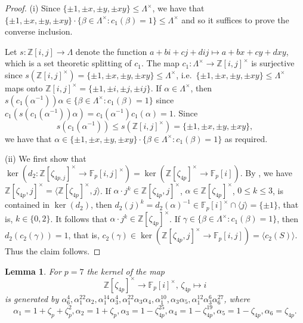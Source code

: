 \documentclass[11pt,leqno,a4paper]{amsart}
\newcommand{\Z}{\mathbb{Z}}
\newcommand{\F}{\mathbb{F}}
\newtheorem{lemma}[thm]{Lemma}
\theoremstyle{definition}
\theoremstyle{remark}
\theoremstyle{custom}
\renewcommand{\l}{\Lambda}
\begin{document}
\begin{proof}
(i) Since $\{\pm 1, \pm x, \pm y, \pm xy\} \le \l^\times$, we have that $\{\pm 1, \pm x, \pm y, \pm xy\} \cdot \{ \beta \in \l^\times : c_1(\beta)=1\} \le \l^\times$ and so it suffices to prove the converse inclusion.

Let $s : \Z[i,j] \to \l$ denote the function $a +bi +cj +dij \mapsto a+bx+cy+dxy$, which is a set theoretic splitting of $c_1$.
The map $c_1 : \l^\times \to \Z[i,j]^\times$ is surjective since $s(\Z[i,j]^\times) = \{\pm 1, \pm x, \pm y, \pm xy\} \le \l^\times$, i.e.~$\{\pm 1, \pm x, \pm y, \pm xy\} \le \l^\times$ maps onto $\Z[i,j]^\times = \{\pm 1, \pm i, \pm j, \pm ij\}$.
If $\alpha \in \l^\times$, then $s(c_1(\alpha^{-1}))\alpha \in \{ \beta \in \l^\times : c_1(\beta)=1\}$ since $c_1(s(c_1(\alpha^{-1}))\alpha) = c_1(\alpha^{-1}) c_1(\alpha) = 1$. Since 
\[ s(c_1(\alpha^{-1})) \le s(\Z[i,j]^\times) = \{\pm 1, \pm x, \pm y, \pm xy\},\] 
we have that $\alpha \in \{\pm 1, \pm x, \pm y, \pm xy\} \cdot \{ \beta \in \l^\times : c_1(\beta)=1\}$ as required.

(ii)
We first show that $\ker(d_2 \colon \Z[\zeta_{4p, j}]^\times \to \F_p[i, j]^\times) = \ker(\Z[\zeta_{4p}]^\times \to \F_p[i])$. 
By \cite[Lemma 7.5 (b)]{MOV83}, we have $\Z[\zeta_{4p},j]^\times = \langle \Z[\zeta_{4p}]^\times, j\rangle$.
If $\alpha \cdot j^{k} \in \Z[\zeta_{4p}, j]^\times$, $\alpha \in \Z[\zeta_{4p}]^\times$, $0 \leq k \leq 3$, is contained in $\ker(d_2)$, then $d_2(j)^k = d_2(\alpha)^{-1} \in \F_p[i]^\times \cap \langle j \rangle = \{ \pm 1 \}$, that is, $k \in \{0,2\}$. It follows that $\alpha \cdot j^k \in \Z[\zeta_{4p}]^\times$.
If $\gamma \in \{ \beta \in \Lambda^\times : c_1(\beta) = 1\}$, then $d_2(c_2(\gamma)) = 1$, that is, $c_2(\gamma) \in \ker(\Z[\zeta_{4p}, j]^\times \to \F_p[i, j]) = \langle c_2(S) \rangle$. Thus the claim follows.
\end{proof}

\begin{lemma}\label{lemma:p7_2}
For $p = 7$ the kernel of the map
    \[ \Z[\zeta_{4p}]^\times \to \F_p[i]^\times, \, \zeta_{4p} \mapsto i\]
    is generated by $\alpha_6^4, \alpha_1^{22}\alpha_2, \alpha_1^{14}\alpha_3^4,\alpha_1^{22}\alpha_3\alpha_4,\alpha_1^{10}, \alpha_3\alpha_5,\alpha_1^{12}\alpha_3^6\alpha_6^{27}$,
    where
    \[ \alpha_1 = 1 + \zeta_p + \zeta_p^2, \alpha_2 = 1 + \zeta_p, \alpha_3 = 1 - \zeta_{4p}^{25}, \alpha_4 = 1 - \zeta_{4p}^{19}, \alpha_5 = 1 - \zeta_{4p}, \alpha_6 = \zeta_{4p}.\]
\end{lemma}
\end{document}
